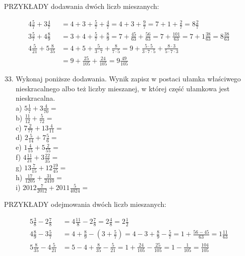 \documentclass[10pt]{article}
\begin{document}
PRZYKŁADY dodawania dwóch liczb mieszanych:

\[
\begin{aligned}
4 \frac{5}{7}+3 \frac{4}{7} & =4+3+\frac{5}{7}+\frac{4}{7}=4+3+\frac{9}{7}=7+1+\frac{2}{7}=8 \frac{2}{7} \\
3 \frac{5}{7}+4 \frac{8}{9} & =3+4+\frac{5}{7}+\frac{8}{9}=7+\frac{45}{63}+\frac{56}{63}=7+\frac{101}{63}=7+1 \frac{38}{63}=8 \frac{38}{63} \\
4 \frac{5}{21}+5 \frac{8}{35} & =4+5+\frac{5}{3 \cdot 7}+\frac{8}{7 \cdot 5}=9+\frac{5 \cdot 5}{3 \cdot 7 \cdot 5}+\frac{8 \cdot 3}{5 \cdot 7 \cdot 3} \\
& =9+\frac{25}{105}+\frac{24}{105}=9 \frac{49}{105}
\end{aligned}
\]

\begin{enumerate}
  \setcounter{enumi}{32}
  \item Wykonaj poniższe dodawania. Wynik zapisz w postaci ułamka właściwego nieskracalnego albo też liczby mieszanej, w której część ułamkowa jest nieskracalna.\\
a) \(5 \frac{1}{7}+3 \frac{4}{70}=\)\\
b) \(\frac{11}{12}+\frac{5}{72}=\)\\
c) \(7 \frac{2}{77}+13 \frac{4}{11}=\)\\
d) \(2 \frac{5}{14}+7 \frac{5}{6}=\)\\
e) \(1 \frac{4}{15}+5 \frac{2}{55}=\)\\
f) \(4 \frac{11}{21}+3 \frac{22}{35}=\)\\
g) \(13 \frac{7}{15}+12 \frac{19}{45}=\)\\
h) \(\frac{17}{1205}+\frac{31}{2410}=\)\\
i) \(2012 \frac{7}{2012}+2011 \frac{5}{4024}=\)
\end{enumerate}

PRZYKŁADY odejmowania dwóch liczb mieszanych:

\[
\begin{aligned}
5 \frac{3}{8}-2 \frac{7}{8} & =4 \frac{11}{8}-2 \frac{7}{8}=2 \frac{4}{8}=2 \frac{1}{2} \\
4 \frac{8}{9}-3 \frac{5}{7} & =4+\frac{8}{9}-\left(3+\frac{5}{7}\right)=4-3+\frac{8}{9}-\frac{5}{7}=1+\frac{56-45}{63}=1 \frac{11}{63} \\
5 \frac{8}{35}-4 \frac{5}{21} & =5-4+\frac{8}{35}-\frac{5}{21}=1+\frac{24}{105}-\frac{25}{105}=1-\frac{1}{105}=\frac{104}{105}
\end{aligned}
\]
\end{document}

